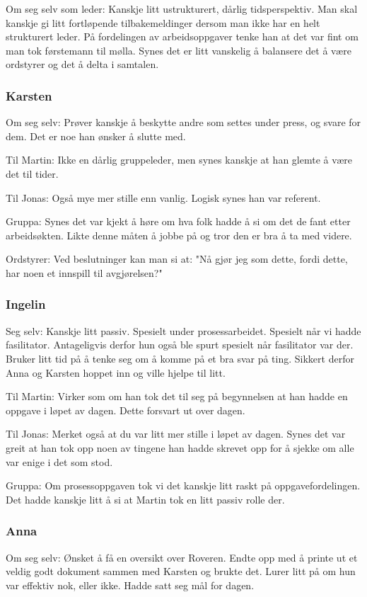 \documentclass[5p]{elsarticle}
\begin{document}
Om seg selv som leder: Kanskje litt ustrukturert, dårlig tidsperspektiv. Man skal kanskje gi litt fortløpende tilbakemeldinger dersom man ikke har en helt strukturert leder. På fordelingen av arbeidsoppgaver tenke han at det var fint om man tok førstemann til mølla. Synes det er litt vanskelig å balansere det å være ordstyrer og det å delta i samtalen.

\subsubsection*{Karsten}
Om seg selv: Prøver kanskje å beskytte andre som settes under press, og svare for dem. Det er noe han ønsker å slutte med.

Til Martin: Ikke en dårlig gruppeleder, men synes kanskje at han glemte å være det til tider.

Til Jonas: Også mye mer stille enn vanlig. Logisk synes han var referent.

Gruppa: Synes det var kjekt å høre om hva folk hadde å si om det de fant etter arbeidsøkten. Likte denne måten å jobbe på og tror den er bra å ta med videre.

Ordstyrer: Ved beslutninger kan man si at: "Nå gjør jeg som dette, fordi dette, har noen et innspill til avgjørelsen?"

\subsubsection*{Ingelin}
Seg selv: Kanskje litt passiv. Spesielt under prosessarbeidet. Spesielt når vi hadde fasilitator. Antageligvis derfor hun også ble spurt spesielt når fasilitator var der. Bruker litt tid på å tenke seg om å komme på et bra svar på ting. Sikkert derfor Anna og Karsten hoppet inn og ville hjelpe til litt.

Til Martin: Virker som om han tok det til seg på begynnelsen at han hadde en oppgave i løpet av dagen. Dette forsvart ut over dagen.

Til Jonas: Merket også at du var litt mer stille i løpet av dagen. Synes det var greit at han tok opp noen av tingene han hadde skrevet opp for å sjekke om alle var enige i det som stod.

Gruppa: Om prosessoppgaven tok vi det kanskje litt raskt på oppgavefordelingen. Det hadde kanskje litt å si at Martin tok en litt passiv rolle der.

\subsubsection*{Anna}
Om seg selv: Ønsket å få en oversikt over Roveren. Endte opp med å printe ut et veldig godt dokument sammen med Karsten og brukte det. Lurer litt på om hun var effektiv nok, eller ikke. Hadde satt seg mål for dagen.
\end{document}
